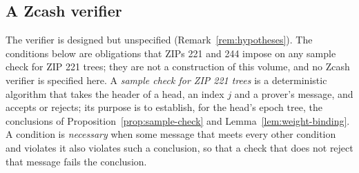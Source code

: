 \documentclass[11pt,a4paper]{article}
\theoremstyle{definition}
\begin{document}
\subsection{A Zcash verifier}\label{sec:boundary-verifier}

The verifier is designed but unspecified (Remark~\ref{rem:hypotheses}). The
conditions below are obligations that ZIPs 221 and 244 impose on any sample
check for ZIP 221 trees; they are not a construction of this volume, and no
Zcash verifier is specified here. A \emph{sample check for ZIP 221 trees} is
a deterministic algorithm that takes the header of a head, an index $j$ and a
prover's message, and accepts or rejects; its purpose is to establish, for
the head's epoch tree, the conclusions of
Proposition~\ref{prop:sample-check} and Lemma~\ref{lem:weight-binding}. A
condition is \emph{necessary} when some message that meets every other
condition and violates it also violates such a conclusion, so that a check
that does not reject that message fails the conclusion.
\end{document}
